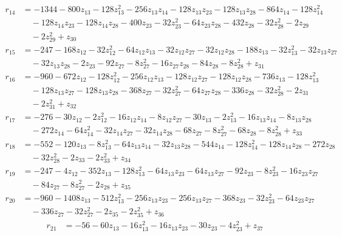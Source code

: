 \begin{align*}
r_{14} &=-1344-800z_{13}-128z_{13}^{2}-256z_{13}z_{14}-128z_{13}z_{23}-128z_{13}z_{28}-864z_{14}-128z_{14}^{2}\\
&\quad -128z_{14}z_{23}-128z_{14}z_{28}-400z_{23}-32z_{23}^{2}-64z_{23}z_{28}-432z_{28}-32z_{28}^{2}-2z_{29}\\
&\quad -2z_{29}^{2}+z_{30}
\end{align*}
\begin{align*}
r_{15} &=-247-168z_{12}-32z_{12}^{2}-64z_{12}z_{13}-32z_{12}z_{27}-32z_{12}z_{28}-188z_{13}-32z_{13}^{2}-32z_{13}z_{27}\\
&\quad -32z_{13}z_{28}-2z_{23}-92z_{27}-8z_{27}^{2}-16z_{27}z_{28}-84z_{28}-8z_{28}^{2}+z_{31}
\end{align*}
\begin{align*}
r_{16} &=-960-672z_{12}-128z_{12}^{2}-256z_{12}z_{13}-128z_{12}z_{27}-128z_{12}z_{28}-736z_{13}-128z_{13}^{2}\\
&\quad -128z_{13}z_{27}-128z_{13}z_{28}-368z_{27}-32z_{27}^{2}-64z_{27}z_{28}-336z_{28}-32z_{28}^{2}-2z_{31}\\
&\quad -2z_{31}^{2}+z_{32}
\end{align*}
\begin{align*}
r_{17} &=-276-30z_{12}-2z_{12}^{2}-16z_{12}z_{14}-8z_{12}z_{27}-30z_{13}-2z_{13}^{2}-16z_{13}z_{14}-8z_{13}z_{28}\\
&\quad -272z_{14}-64z_{14}^{2}-32z_{14}z_{27}-32z_{14}z_{28}-68z_{27}-8z_{27}^{2}-68z_{28}-8z_{28}^{2}+z_{33}
\end{align*}
\begin{align*}
r_{18} &=-552-120z_{13}-8z_{13}^{2}-64z_{13}z_{14}-32z_{13}z_{28}-544z_{14}-128z_{14}^{2}-128z_{14}z_{28}-272z_{28}\\
&\quad -32z_{28}^{2}-2z_{33}-2z_{33}^{2}+z_{34}
\end{align*}
\begin{align*}
r_{19} &=-247-4z_{12}-352z_{13}-128z_{13}^{2}-64z_{13}z_{23}-64z_{13}z_{27}-92z_{23}-8z_{23}^{2}-16z_{23}z_{27}\\
&\quad -84z_{27}-8z_{27}^{2}-2z_{28}+z_{35}
\end{align*}
\begin{align*}
r_{20} &=-960-1408z_{13}-512z_{13}^{2}-256z_{13}z_{23}-256z_{13}z_{27}-368z_{23}-32z_{23}^{2}-64z_{23}z_{27}\\
&\quad -336z_{27}-32z_{27}^{2}-2z_{35}-2z_{35}^{2}+z_{36}
\end{align*}
\begin{align*}
r_{21} &=-56-60z_{13}-16z_{13}^{2}-16z_{13}z_{23}-30z_{23}-4z_{23}^{2}+z_{37}
\end{align*}
